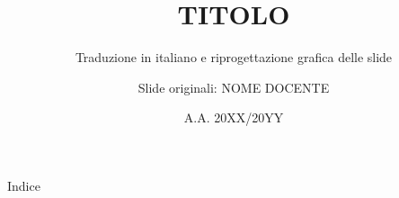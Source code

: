 \documentclass[aspectratio=169,11pt]{beamer}
\title{TITOLO}
\subtitle{Traduzione in italiano e riprogettazione grafica delle slide}
\author{Slide originali: NOME DOCENTE}
\institute{NOME CORSO}
\date{A.A. 20XX/20YY}
\begin{document}
\begin{frame}[plain]\titlepage\end{frame}
\begin{frame}{Indice}\indicecompatto\end{frame}


\end{document}

